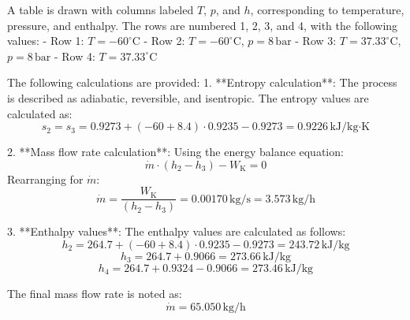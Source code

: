 A table is drawn with columns labeled \(T\), \(p\), and \(h\), corresponding to temperature, pressure, and enthalpy. The rows are numbered 1, 2, 3, and 4, with the following values:  
- Row 1: \(T = -60^\circ\text{C}\)  
- Row 2: \(T = -60^\circ\text{C}\), \(p = 8 \, \text{bar}\)  
- Row 3: \(T = 37.33^\circ\text{C}\), \(p = 8 \, \text{bar}\)  
- Row 4: \(T = 37.33^\circ\text{C}\)  

The following calculations are provided:  
1. **Entropy calculation**:  
   The process is described as adiabatic, reversible, and isentropic. The entropy values are calculated as:  
   \[
   s_2 = s_3 = 0.9273 + \left(-60 + 8.4\right) \cdot 0.9235 - 0.9273 = 0.9226 \, \text{kJ/kg·K}
   \]

2. **Mass flow rate calculation**:  
   Using the energy balance equation:  
   \[
   \dot{m} \cdot (h_2 - h_3) - W_{\text{K}} = 0
   \]  
   Rearranging for \(\dot{m}\):  
   \[
   \dot{m} = \frac{W_{\text{K}}}{(h_2 - h_3)} = 0.00170 \, \text{kg/s} = 3.573 \, \text{kg/h}
   \]

3. **Enthalpy values**:  
   The enthalpy values are calculated as follows:  
   \[
   h_2 = 264.7 + \left(-60 + 8.4\right) \cdot 0.9235 - 0.9273 = 243.72 \, \text{kJ/kg}
   \]  
   \[
   h_3 = 264.7 + 0.9066 = 273.66 \, \text{kJ/kg}
   \]  
   \[
   h_4 = 264.7 + 0.9324 - 0.9066 = 273.46 \, \text{kJ/kg}
   \]  

The final mass flow rate is noted as:  
\[
\dot{m} = 65.050 \, \text{kg/h}
\]
